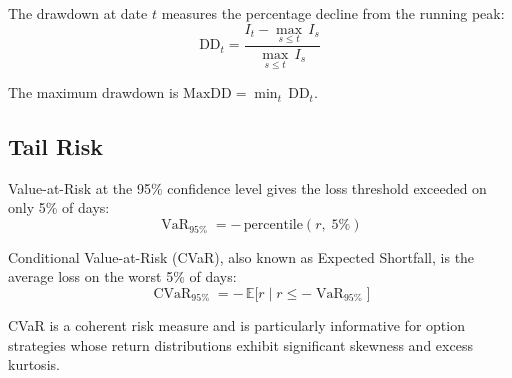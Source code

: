 \documentclass[10pt,twocolumn,a4paper]{article}
\newcommand{\E}{\mathbb{E}}
\DeclareMathOperator{\VaR}{VaR}
\DeclareMathOperator{\CVaR}{CVaR}
\theoremstyle{mydef}
\begin{document}
The drawdown at date $t$ measures the percentage decline from the
running peak:
\begin{equation}
  \mathrm{DD}_t =
    \frac{I_t - \max_{s \leq t}\,I_s}{\max_{s \leq t}\,I_s}
  \label{eq:dd}
\end{equation}

The maximum drawdown is $\mathrm{MaxDD} = \min_t\,\mathrm{DD}_t$.

\subsection{Tail Risk}

Value-at-Risk at the 95\% confidence level gives the loss threshold
exceeded on only 5\% of days:
\begin{equation}
  \VaR_{95\%} = -\,\mathrm{percentile}(r,\; 5\%)
  \label{eq:var}
\end{equation}

Conditional Value-at-Risk (CVaR), also known as Expected Shortfall,
is the average loss on the worst 5\% of days:
\begin{equation}
  \CVaR_{95\%} = -\,\E\bigl[r \;\big|\; r \leq -\VaR_{95\%}\bigr]
  \label{eq:cvar}
\end{equation}

CVaR is a coherent risk measure \citep{artzner_1999} and is
particularly informative for option strategies whose return
distributions exhibit significant skewness and excess kurtosis.

\end{document}
